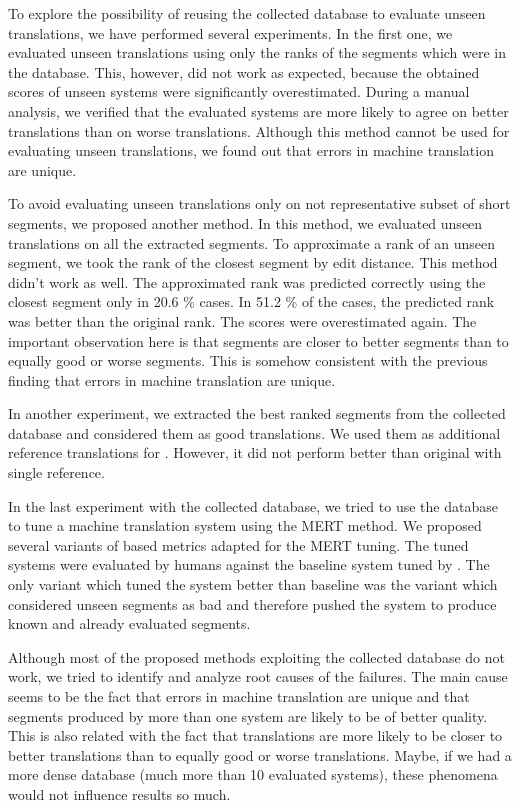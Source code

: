 To explore the possibility of reusing the collected database to evaluate unseen
translations, we have performed several experiments. In the first one, we
evaluated unseen translations using only the ranks of the segments which were
in the database.  This, however, did not work as expected, because the obtained
scores of unseen systems were significantly overestimated. During a manual
analysis, we verified that the evaluated systems are more likely to agree on
better translations than on worse translations. Although this method cannot be
used for evaluating unseen translations, we found out that errors in machine
translation are unique.

To avoid evaluating unseen translations only on not representative subset of
short segments, we proposed another method. In this method, we evaluated unseen
translations on all the extracted segments. To approximate a rank of an unseen
segment, we took the rank of the closest segment by edit distance. This method
didn't work as well.  The approximated rank was predicted correctly using the
closest segment only in 20.6 \% cases.  In 51.2 \% of the cases, the predicted
rank was better than the original rank. The scores were overestimated again.
The important observation here is that segments are closer to better segments
than to equally good or worse segments. This is somehow consistent with the
previous finding that errors in machine translation are unique.

In another experiment, we extracted the best ranked segments from the collected
database and considered them as good translations. We used them as additional
reference translations for . However, it did not perform better
than original  with single reference. 

In the last experiment with the collected database, we tried to use the
database to tune a machine translation system using the MERT method.  We
proposed several variants of  based metrics adapted for the
MERT tuning. The tuned systems were evaluated by humans against the baseline
system tuned by . The only variant which tuned the system better
than baseline was the variant which considered unseen segments as bad and
therefore pushed the system to produce known and already evaluated segments.

Although most of the proposed methods exploiting the collected database do not
work, we tried to identify and analyze root causes of the failures. The main
cause seems to be the fact that errors in machine translation are unique and
that segments produced by more than one system are likely to be of better
quality. This is also related with the fact that translations are more likely
to be closer to better translations than to equally good or worse translations.
Maybe, if we had a more dense database (much more than 10 evaluated systems),
these phenomena would not influence results so much.

